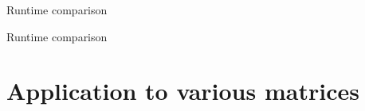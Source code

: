 \begin{table}[ht]
    \caption{Runtime comparison}
    \label{tab:5-experiments-timing-DGC}
    
\end{table}

\begin{table}[ht]
    \caption{Runtime comparison}
    \label{tab:5-experiments-timing-haydock}
   
\end{table}


\section{Application to various matrices}
\label{sec:5-experiments-various-matrices}

